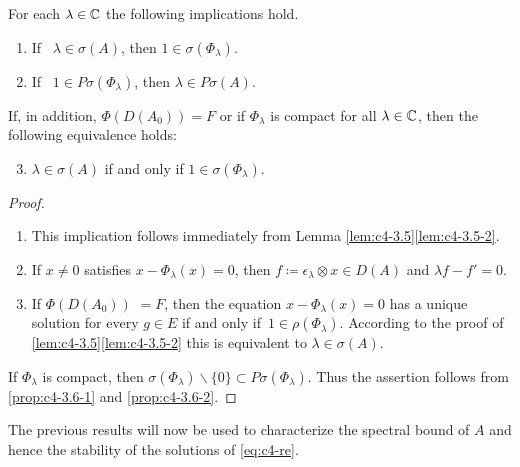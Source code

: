 \begin{proposition}\label{prop:c4-3.6}
%
%
For each $\lambda \in \mathbb{C}$ the following implications hold.
\begin{enumerate}[\upshape (i)]
\item \label{prop:c4-3.6-1}
If \, $\lambda \in \sigma(A)$, then $1 \in \sigma(\Phi_{\lambda})$.
\item \label{prop:c4-3.6-2}
If \, $1 \in P\sigma(\Phi_{\lambda})$, then $\lambda \in P\sigma(A)$.
\end{enumerate}
If, in addition, $\Phi(D(A_{0})) = F$ or if $\Phi_{\lambda}$ is compact for all $\lambda \in \mathbb{C}$, then the following equivalence holds:
\begin{enumerate}[\upshape (i)]
\setcounter{enumi}{2}
\item \label{prop:c4-3.6-3}
$\lambda \in \sigma(A)$ if and only if $1 \in \sigma(\Phi_{\lambda})$.
\end{enumerate}
\end{proposition}
\begin{proof}
\begin{enumerate}[\upshape (i), wide, labelindent=.5em] 
\item 
This implication follows immediately from Lemma \ref{lem:c4-3.5}\ref{lem:c4-3.5-2}.

\item 
If $x \neq 0$ satisfies $x - \Phi_{\lambda}(x) = 0$, then $f \coloneq  \epsilon_{\lambda} \otimes x \in D(A)$ and $\lambda f - f' = 0$.

\item 
If $\Phi(D(A_{0}))$ $= F$,  then the equation $x - \Phi_{\lambda}(x) = 0$ has a
unique solution for every $g \in E$ if and only if\, $1 \in \rho(\Phi_{\lambda})$. 
According to the proof of \ref{lem:c4-3.5}\ref{lem:c4-3.5-2} this is equivalent to $\lambda \in \sigma(A)$.
\end{enumerate}
If $\Phi_{\lambda}$ is compact, then $\sigma(\Phi_{\lambda})\backslash\{0\} \subset P\sigma(\Phi_{\lambda})$. Thus the assertion follows from \ref{prop:c4-3.6-1} and \ref{prop:c4-3.6-2}.
\end{proof}
The previous results will now be used to characterize the spectral bound of $A$ and hence the stability of the solutions of \eqref{eq:c4-re}.

